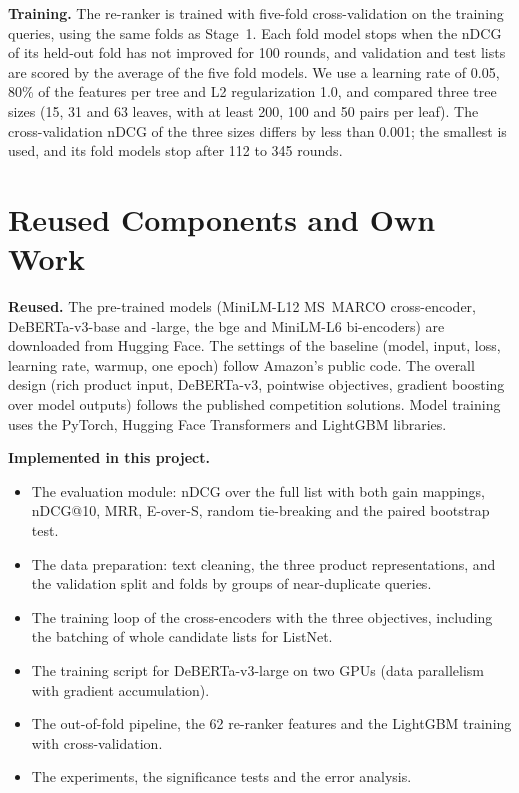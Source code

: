 \documentclass[12pt,a4paper]{report}
\begin{document}
\textbf{Training.} The re-ranker is trained with five-fold cross-validation on the training queries, using the same folds as Stage~1. Each fold model stops when the nDCG of its held-out fold has not improved for 100 rounds, and validation and test lists are scored by the average of the five fold models. We use a learning rate of 0.05, 80\% of the features per tree and L2 regularization 1.0, and compared three tree sizes (15, 31 and 63 leaves, with at least 200, 100 and 50 pairs per leaf). The cross-validation nDCG of the three sizes differs by less than 0.001; the smallest is used, and its fold models stop after 112 to 345 rounds.

\section{Reused Components and Own Work}\label{sec:reuse}
\textbf{Reused.} The pre-trained models (MiniLM-L12 MS~MARCO cross-encoder, DeBERTa-v3-base and -large, the bge and MiniLM-L6 bi-encoders) are downloaded from Hugging Face. The settings of the baseline (model, input, loss, learning rate, warmup, one epoch) follow Amazon's public code. The overall design (rich product input, DeBERTa-v3, pointwise objectives, gradient boosting over model outputs) follows the published competition solutions. Model training uses the PyTorch, Hugging Face Transformers and LightGBM libraries.

\textbf{Implemented in this project.}
\begin{itemize}
  \item The evaluation module: nDCG over the full list with both gain mappings, nDCG@10, MRR, E-over-S, random tie-breaking and the paired bootstrap test.
  \item The data preparation: text cleaning, the three product representations, and the validation split and folds by groups of near-duplicate queries.
  \item The training loop of the cross-encoders with the three objectives, including the batching of whole candidate lists for ListNet.
  \item The training script for DeBERTa-v3-large on two GPUs (data parallelism with gradient accumulation).
  \item The out-of-fold pipeline, the 62 re-ranker features and the LightGBM training with cross-validation.
  \item The experiments, the significance tests and the error analysis.
\end{itemize}
\end{document}
